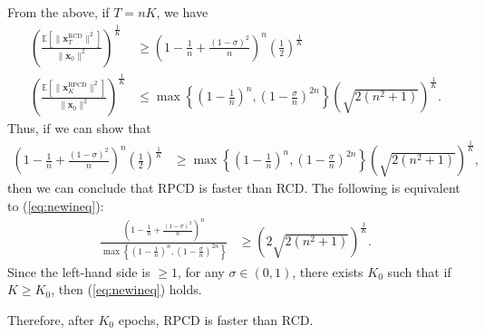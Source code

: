 \documentclass{article}
\theoremstyle{plain}
\theoremstyle{definition}
\theoremstyle{remark}
\def\bigopen#1{\left(#1\right)}
\def\bigclosed#1{\left[#1\right]}
\def\vx{{\bm{x}}}
\newcommand{\E}{\mathbb{E}}
\begin{document}
From the above, if $T = nK$, we have
\begin{align*}
    \bigopen{\frac{\E \bigclosed{\|\vx_T^{\text{RCD}}\|^2}}{\|\vx_0\|^2}}^{\frac{1}{K}} &\ge \left(1 - \frac{1}{n} + \frac{(1-\sigma)^2}{n}\right)^n \bigopen{\frac{1}{2}}^{\frac{1}{K}} \\
    \bigopen{\frac{\E \bigclosed{\|\vx_K^{\text{RPCD}}\|^2}}{\|\vx_0\|^2}}^{\frac{1}{K}} &\le \max\left\{\left(1-\frac{1}{n}\right)^n, \left(1-\frac{\sigma}{n}\right)^{2n}\right\} \bigopen{\sqrt{2(n^2+1)}}^{\frac{1}{K}}.
\end{align*}
Thus, if we can show that 
\begin{align}
\label{eq:newineq}
    \left(1 - \frac{1}{n} + \frac{(1-\sigma)^2}{n}\right)^n \bigopen{\frac{1}{2}}^{\frac{1}{K}} 
    &\ge \max\left\{\left(1-\frac{1}{n}\right)^n, \left(1-\frac{\sigma}{n}\right)^{2n}\right\} \bigopen{\sqrt{2(n^2+1)}}^{\frac{1}{K}},
\end{align}
then we can conclude that RPCD is faster than RCD.
The following is equivalent to (\ref{eq:newineq}):
\begin{align*}
    \frac{\left(1 - \frac{1}{n} + \frac{(1-\sigma)^2}{n}\right)^n}{\max\left\{\left(1-\frac{1}{n}\right)^n, \left(1-\frac{\sigma}{n}\right)^{2n}\right\}} 
    &\ge  \bigopen{2\sqrt{2(n^2+1)}}^{\frac{1}{K}}.
\end{align*}
Since the left-hand side is $\ge 1$, for any $\sigma \in (0, 1)$, there exists $K_0$ such that if $K \ge K_0$, then (\ref{eq:newineq}) holds.

Therefore, after $K_0$ epochs, RPCD is faster than RCD.

\end{document}
